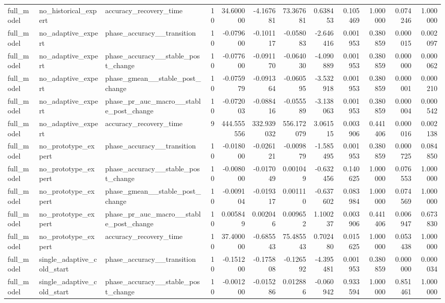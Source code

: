 \begin{tabular}{lllrrrrrrrrr}
full\_model & no\_historical\_expert & accuracy\_recovery\_time & 10 & 34.600000 & -4.167681 & 73.367681 & 0.638453 & 0.105469 & 1.000000 & 0.074246 & 1.000000 \\
full\_model & no\_adaptive\_expert & phase\_accuracy\_\_transition & 10 & -0.079600 & -0.101117 & -0.058083 & -2.646416 & 0.001953 & 0.380859 & 0.000015 & 0.002097 \\
full\_model & no\_adaptive\_expert & phase\_accuracy\_\_stable\_post\_change & 10 & -0.077600 & -0.091170 & -0.064030 & -4.090889 & 0.001953 & 0.380859 & 0.000000 & 0.000062 \\
full\_model & no\_adaptive\_expert & phase\_gmean\_\_stable\_post\_change & 10 & -0.075979 & -0.091364 & -0.060595 & -3.532918 & 0.001953 & 0.380859 & 0.000001 & 0.000210 \\
full\_model & no\_adaptive\_expert & phase\_pr\_auc\_macro\_\_stable\_post\_change & 10 & -0.072003 & -0.088416 & -0.055589 & -3.138063 & 0.001953 & 0.380859 & 0.000004 & 0.000542 \\
full\_model & no\_adaptive\_expert & accuracy\_recovery\_time & 9 & 444.555556 & 332.939032 & 556.172079 & 3.061515 & 0.003906 & 0.441406 & 0.000016 & 0.002138 \\
full\_model & no\_prototype\_expert & phase\_accuracy\_\_transition & 10 & -0.018000 & -0.026121 & -0.009879 & -1.585495 & 0.001953 & 0.380859 & 0.000725 & 0.084850 \\
full\_model & no\_prototype\_expert & phase\_accuracy\_\_stable\_post\_change & 10 & -0.008000 & -0.017049 & 0.001049 & -0.632456 & 0.140625 & 1.000000 & 0.076553 & 1.000000 \\
full\_model & no\_prototype\_expert & phase\_gmean\_\_stable\_post\_change & 10 & -0.009104 & -0.019317 & 0.001110 & -0.637602 & 0.083984 & 1.000000 & 0.074569 & 1.000000 \\
full\_model & no\_prototype\_expert & phase\_pr\_auc\_macro\_\_stable\_post\_change & 10 & 0.005849 & 0.002046 & 0.009652 & 1.100237 & 0.003906 & 0.441406 & 0.006947 & 0.673830 \\
full\_model & no\_prototype\_expert & accuracy\_recovery\_time & 10 & 37.400000 & -0.685543 & 75.485543 & 0.702480 & 0.015625 & 1.000000 & 0.053438 & 1.000000 \\
full\_model & single\_adaptive\_cold\_start & phase\_accuracy\_\_transition & 10 & -0.151200 & -0.175808 & -0.126592 & -4.395481 & 0.001953 & 0.380859 & 0.000000 & 0.000034 \\
full\_model & single\_adaptive\_cold\_start & phase\_accuracy\_\_stable\_post\_change & 10 & -0.001200 & -0.015286 & 0.012886 & -0.060942 & 0.933594 & 1.000000 & 0.851461 & 1.000000 \\

\end{tabular}
